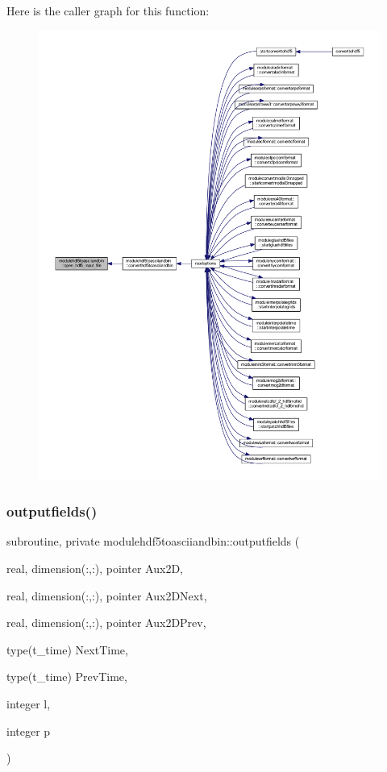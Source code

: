 Here is the caller graph for this function\+:\nopagebreak
\begin{figure}[H]
\begin{center}
\leavevmode
\includegraphics[width=350pt]{namespacemodulehdf5toasciiandbin_ac11d594ac1ad5acf256f4066315f5028_icgraph}
\end{center}
\end{figure}
\mbox{\label{namespacemodulehdf5toasciiandbin_a086893f6436263f0d9e808b779d5441d}} 
\subsubsection{\texorpdfstring{outputfields()}{outputfields()}}
{\footnotesize\ttfamily subroutine, private modulehdf5toasciiandbin\+::outputfields (\begin{DoxyParamCaption}\item[{real, dimension(\+:,\+:), pointer}]{Aux2D,  }\item[{real, dimension(\+:,\+:), pointer}]{Aux2\+D\+Next,  }\item[{real, dimension(\+:,\+:), pointer}]{Aux2\+D\+Prev,  }\item[{type(t\+\_\+time)}]{Next\+Time,  }\item[{type(t\+\_\+time)}]{Prev\+Time,  }\item[{integer}]{l,  }\item[{integer}]{p }\end{DoxyParamCaption})\hspace{0.3cm}{\ttfamily [private]}}

